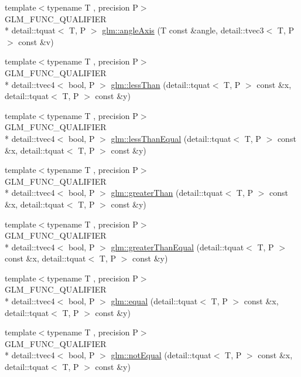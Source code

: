 \begin{DoxyCompactItemize}
\item 
{\footnotesize template$<$typename T , precision P$>$ }\\G\-L\-M\-\_\-\-F\-U\-N\-C\-\_\-\-Q\-U\-A\-L\-I\-F\-I\-E\-R \\*
detail\-::tquat$<$ T, P $>$ \hyperlink{group__gtc__quaternion_ga771b3e16cca8324e7111b923476be666}{glm\-::angle\-Axis} (T const \&angle, detail\-::tvec3$<$ T, P $>$ const \&v)
\item 
{\footnotesize template$<$typename T , precision P$>$ }\\G\-L\-M\-\_\-\-F\-U\-N\-C\-\_\-\-Q\-U\-A\-L\-I\-F\-I\-E\-R \\*
detail\-::tvec4$<$ bool, P $>$ \hyperlink{group__gtc__quaternion_ga4e4c37b86cecde7e1076c5b5fdb920b9}{glm\-::less\-Than} (detail\-::tquat$<$ T, P $>$ const \&x, detail\-::tquat$<$ T, P $>$ const \&y)
\item 
{\footnotesize template$<$typename T , precision P$>$ }\\G\-L\-M\-\_\-\-F\-U\-N\-C\-\_\-\-Q\-U\-A\-L\-I\-F\-I\-E\-R \\*
detail\-::tvec4$<$ bool, P $>$ \hyperlink{group__gtc__quaternion_ga313fe20896a8cd43c6d08cc88fa18faa}{glm\-::less\-Than\-Equal} (detail\-::tquat$<$ T, P $>$ const \&x, detail\-::tquat$<$ T, P $>$ const \&y)
\item 
{\footnotesize template$<$typename T , precision P$>$ }\\G\-L\-M\-\_\-\-F\-U\-N\-C\-\_\-\-Q\-U\-A\-L\-I\-F\-I\-E\-R \\*
detail\-::tvec4$<$ bool, P $>$ \hyperlink{group__gtc__quaternion_ga63be67bccef0b0ad4e60656223ab3761}{glm\-::greater\-Than} (detail\-::tquat$<$ T, P $>$ const \&x, detail\-::tquat$<$ T, P $>$ const \&y)
\item 
{\footnotesize template$<$typename T , precision P$>$ }\\G\-L\-M\-\_\-\-F\-U\-N\-C\-\_\-\-Q\-U\-A\-L\-I\-F\-I\-E\-R \\*
detail\-::tvec4$<$ bool, P $>$ \hyperlink{group__gtc__quaternion_gac90d5af34a03cd665a349ac30e4cc44c}{glm\-::greater\-Than\-Equal} (detail\-::tquat$<$ T, P $>$ const \&x, detail\-::tquat$<$ T, P $>$ const \&y)
\item 
{\footnotesize template$<$typename T , precision P$>$ }\\G\-L\-M\-\_\-\-F\-U\-N\-C\-\_\-\-Q\-U\-A\-L\-I\-F\-I\-E\-R \\*
detail\-::tvec4$<$ bool, P $>$ \hyperlink{group__gtc__quaternion_ga32ff2cc6fb576639a6237d8d8ed5818b}{glm\-::equal} (detail\-::tquat$<$ T, P $>$ const \&x, detail\-::tquat$<$ T, P $>$ const \&y)
\item 
{\footnotesize template$<$typename T , precision P$>$ }\\G\-L\-M\-\_\-\-F\-U\-N\-C\-\_\-\-Q\-U\-A\-L\-I\-F\-I\-E\-R \\*
detail\-::tvec4$<$ bool, P $>$ \hyperlink{group__gtc__quaternion_gaa3a8cf1aa580e435ca96acafbd7870a5}{glm\-::not\-Equal} (detail\-::tquat$<$ T, P $>$ const \&x, detail\-::tquat$<$ T, P $>$ const \&y)
\end{DoxyCompactItemize}


